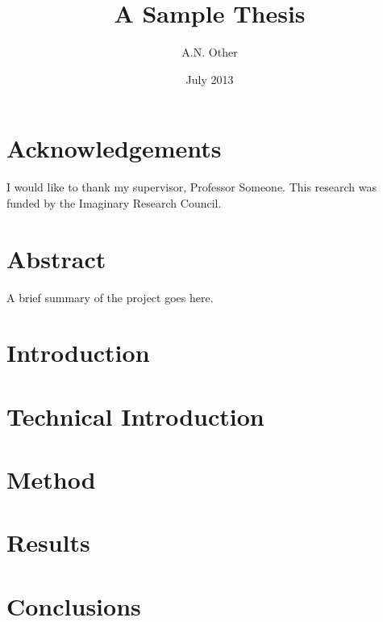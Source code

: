 \documentclass[oneside]{scrbook}
\title{A Sample Thesis}
\author{A.N. Other}
\date{July 2013}
\begin{document}
\maketitle
\frontmatter

\tableofcontents
\listoffigures
\listoftables

\chapter{Acknowledgements}
I would like to thank my supervisor, Professor Someone. This
research was funded by the Imaginary Research Council.

\chapter{Abstract}
A brief summary of the project goes here.
\mainmatter

\chapter{Introduction}
\label{ch:intro}

\chapter{Technical Introduction}
\label{ch:techintro}

\chapter{Method}
\label{ch:method}

\chapter{Results}
\label{ch:results}

\chapter{Conclusions}
\label{ch:conc}
\backmatter
\end{document}
